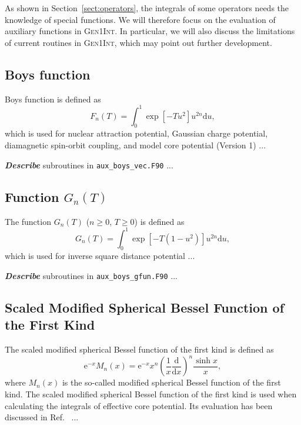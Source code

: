 \documentclass[a4paper,11pt,twoside,openright]{book}
\newcommand{\fixme}[1]{\textbf{\textit{\color{red} #1}}}
\begin{document}
As shown in Section~\ref{sect:operators}, the integrals of some operators needs the knowledge of
special functions. We will therefore focus on the evaluation of auxiliary functions in \textsc{Gen1Int}.
In particular, we will also discuss the limitations of current routines in \textsc{Gen1Int}, which may
point out further development.

\subsection{Boys function}
\label{subsec:boys}

Boys function is defined as
\begin{equation}
  \label{eq:boys-definition}
  F_{n}(T)=\int_0^1\exp[-Tu^2]u^{2n}\mathrm{d}u,
\end{equation}
which is used for nuclear attraction potential, Gaussian charge potential, diamagnetic spin-orbit coupling,
and model core potential (Version 1) ...

\fixme{Describe} subroutines in \verb|aux_boys_vec.F90| ...

\subsection{Function $G_{n}(T)$}
\label{subsec:gfunc}

The function $G_{n}(T)$ ($n\ge0$, $T\ge0$) is defined as
\begin{equation}
  \label{eq:gfunc-definition}
  G_{n}(T)=\int_0^1\exp[-T(1-u^2)]u^{2n}\mathrm{d}u,
\end{equation}
which is used for inverse square distance potential ...

\fixme{Describe} subroutines in \verb|aux_boys_gfun.F90| ...

\subsection{Scaled Modified Spherical Bessel Function of the First Kind}
\label{subsec:bessel}

The scaled modified spherical Bessel function of the first kind is defined as
\begin{equation}
  \mathrm{e}^{-x}M_{n}(x)=\mathrm{e}^{-x}x^{n}\left(\frac{1}{x}\frac{\mathrm{d}}{\mathrm{d}x}\right)^{n}\frac{\sinh x}{x},
\end{equation}
where $M_{n}(x)$ is the so-called modified spherical Bessel function of the first kind.
The scaled modified spherical Bessel function of the first kind is used when calculating
the integrals of effective core potential. Its evaluation has been discussed in
Ref.~\cite{Flores-Moreno:JCC27:1009} ...
\end{document}
